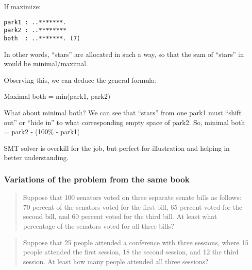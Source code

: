 If maximize:

\begin{lstlisting}
park1 : ..*******.
park2 : ..********
both  : ..*******. (7)
\end{lstlisting}

In other words, ``stars'' are allocated in such a way, so that the sum of ``stars'' in  would be minimal/maximal.

Observing this, we can deduce the general formula:

Maximal both = min(park1, park2)

What about minimal both?
We can see that ``stars'' from one park1 must ``shift out'' or ``hide in'' to what corresponding empty space of park2.
So, minimal both = park2 - (100\% - park1)

SMT solver is overkill for the job, but perfect for illustration and helping in better understanding.

\subsubsection{Variations of the problem from the same book}

\begin{framed}
\begin{quotation}

Suppose that 100 senators voted on three separate senate bills as follows:
70 percent of the senators voted for the first bill, 65 percent voted for the second bill,
and 60 percent voted for the third bill. At least what percentage of the senators voted for all three bills?

\end{quotation}
\end{framed}

\begin{framed}
\begin{quotation}

Suppose that 25 people attended a conference with three sessions, where 15 people attended the first session, 
18 the second session, and 12 the third session. At least how many people attended all three sessions?

\end{quotation}
\end{framed}

